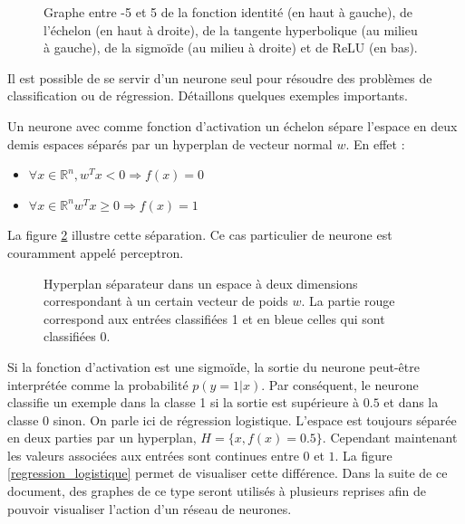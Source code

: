 \documentclass{report}
\begin{document}
\begin{figure}
\begin{center}
\begin{tabular}{cc}
\end{tabular}
\caption{Graphe entre -5 et 5 de la fonction identité (en haut à gauche), de l'échelon (en haut à droite), de la tangente hyperbolique (au milieu à gauche), de la sigmoïde (au milieu à droite) et de ReLU (en bas).} 
\label{fonctions_activation}
\end{center}
\end{figure}

Il est possible de se servir d'un neurone seul pour résoudre des problèmes de classification ou de régression. Détaillons quelques exemples importants.

Un neurone avec comme fonction d'activation un échelon sépare l'espace en deux demis espaces séparés par un hyperplan de vecteur normal $w$. En effet :

\begin{itemize}
\item $ \forall x \in \mathbb{R}^n, w^Tx < 0 \Rightarrow f(x) = 0$
\item $ \forall x \in \mathbb{R}^n w^Tx \geq 0 \Rightarrow f(x) = 1$
\end{itemize}

La figure \ref{hyperplan} illustre cette séparation. Ce cas particulier de neurone est couramment appelé perceptron.

\begin{figure}
\begin{center}

\caption{Hyperplan séparateur dans un espace à deux dimensions correspondant à un certain vecteur de poids $w$. La partie rouge correspond aux entrées classifiées 1 et en bleue celles qui sont classifiées 0.}
\label{hyperplan}
\end{center}
\end{figure}

Si la fonction d'activation est une sigmoïde, la sortie du neurone peut-être interprétée comme la probabilité $p(y=1|x)$. Par conséquent, le neurone classifie un exemple dans la classe 1 si la sortie est supérieure à $0.5$ et dans la classe 0 sinon. On parle ici de régression logistique. L'espace est toujours séparée en deux parties par un hyperplan, $H = \{x, f(x)=0.5\}$. Cependant maintenant les valeurs associées aux entrées sont continues entre $0$ et $1$. La figure \ref{regression_logistique} permet de visualiser cette différence. Dans la suite de ce document, des graphes de ce type seront utilisés à plusieurs reprises afin de pouvoir visualiser l'action d'un réseau de neurones.
\end{document}
